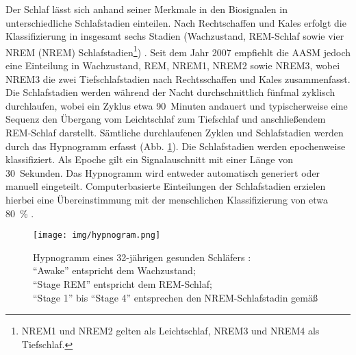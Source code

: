 Der Schlaf lässt sich anhand seiner Merkmale in den Biosignalen in unterschiedliche Schlafstadien einteilen. Nach Rechtschaffen und Kales erfolgt die Klassifizierung in insgesamt sechs Stadien (Wachzustand, \acs{REM}-Schlaf sowie vier \acl{NREM} (\acs{NREM}) Schlafstadien\footnote{\acs{NREM}1 und \acs{NREM}2 gelten als Leichtschlaf, \acs{NREM}3 und \acs{NREM}4 als Tiefschlaf.}) \parencite{rechtschaffen_manual_1968}. Seit dem Jahr 2007 empfiehlt die \acs{AASM} jedoch eine Einteilung in Wachzustand, \acs{REM}, \acs{NREM}1, \acs{NREM}2 sowie \acs{NREM}3, wobei \acs{NREM}3 die zwei Tiefschlafstadien nach Rechtsschaffen und Kales zusammenfasst. Die Schlafstadien werden während der Nacht durchschnittlich fünfmal zyklisch durchlaufen, wobei ein Zyklus etwa 90~Minuten andauert und typischerweise eine Sequenz den Übergang vom Leichtschlaf zum Tiefschlaf und anschließendem REM-Schlaf darstellt. Sämtliche durchlaufenen Zyklen und Schlafstadien werden durch das Hypnogramm erfasst (Abb. \ref{fig:hypnogram}). Die Schlafstadien werden epochenweise klassifiziert. Als Epoche gilt ein Signalauschnitt mit einer Länge von 30~Sekunden. Das Hypnogramm wird entweder automatisch generiert oder manuell eingeteilt. Computerbasierte Einteilungen der Schlafstadien erzielen hierbei eine Übereinstimmung mit der menschlichen Klassifizierung von etwa 80~\% \parencite{rasche_update_2003, penzel_computer_2000}. \parencite{happe_schlafmedizin_2009, iber_aasm_2007}

\begin{figure}[H]
	\centering
	\texttt{[image: img/hypnogram.png]}
	\caption[Hypnogram von gesundem Schlaf]{Hypnogramm eines 32-jährigen gesunden Schläfers \parencite{happe_schlafmedizin_2009}:\\"`Awake"' entspricht dem Wachzustand;\\"`Stage REM"' entspricht dem \acs{REM}-Schlaf;\\"`Stage 1"' bis "`Stage 4"' entsprechen den \acs{NREM}-Schlafstadin gemäß \parencite{rechtschaffen_manual_1968}}
	\label{fig:hypnogram}
\end{figure}

